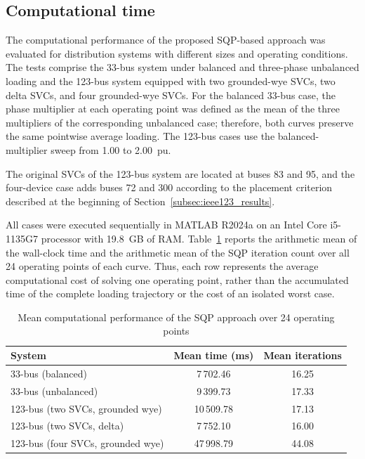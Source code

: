 \documentclass[journal]{IEEEtran}
\begin{document}
\subsection{Computational time}

The computational performance of the proposed SQP-based approach was evaluated
for distribution systems with different sizes and operating conditions. The
tests comprise the 33-bus system under balanced and three-phase unbalanced
loading and the 123-bus system equipped with two grounded-wye SVCs, two delta
SVCs, and four grounded-wye SVCs. For the
balanced 33-bus case, the phase multiplier at each operating point was defined
as the mean of the three multipliers of the corresponding unbalanced case;
therefore, both curves preserve the same pointwise average loading. The
123-bus cases use the balanced-multiplier sweep from 1.00 to 2.00~pu.

The original SVCs of the 123-bus system are located at buses 83 and 95, and the
four-device case adds buses 72 and 300 according to the placement criterion
described at the beginning of Section~\ref{subsec:ieee123_results}.

All cases were executed sequentially in MATLAB R2024a on an Intel Core
i5-1135G7 processor with 19.8~GB of RAM. Table~\ref{tab:sqp_performance}
reports the arithmetic mean of the wall-clock time and the arithmetic mean of
the SQP iteration count over all 24 operating points of each curve. Thus, each
row represents the average computational cost of solving one operating point,
rather than the accumulated time of the complete loading trajectory or the
cost of an isolated worst case.

\begin{table}[!t]
\centering
\caption{Mean computational performance of the SQP approach over 24 operating points}
\label{tab:sqp_performance}
\footnotesize
\setlength{\tabcolsep}{3pt}
\renewcommand{\arraystretch}{1.1}
\begin{tabular}{@{}lcc@{}}
\toprule
System & Mean time (ms) & Mean iterations \\
\midrule
33-bus (balanced) & 7\,702.46 & 16.25 \\
33-bus (unbalanced) & 9\,399.73 & 17.33 \\
123-bus (two SVCs, grounded wye) & 10\,509.78 & 17.13 \\
123-bus (two SVCs, delta) & 7\,752.10 & 16.00 \\
123-bus (four SVCs, grounded wye) & 47\,998.79 & 44.08 \\
\bottomrule
\end{tabular}
\end{table}
\end{document}
